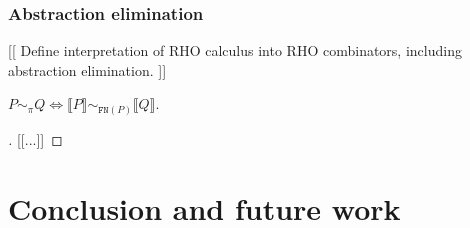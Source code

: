 \documentclass[a4paper,UKenglish]{lipics-v2016}
\newcommand{\interp}[1]{\llbracket #1 \rrbracket}
\begin{document}
\subsubsection{Abstraction elimination}


[[ Define interpretation of RHO calculus into RHO combinators, including abstraction elimination. ]]

\begin{theorem}
  $P \sim_{\pi} Q \iff  \interp{P} \sim_{\texttt{FN}(P)} \interp{Q}$.
\end{theorem}

\begin{proof}[]
  [[...]]
\end{proof}
\section{Conclusion and future work}



\end{document}
